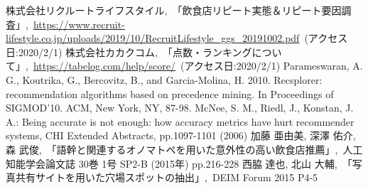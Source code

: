 \documentclass[honka]{nitkcthesis}%
\begin{document}










\backmatter



\begin{thebibliography}{99}
  株式会社リクルートライフスタイル,~「飲食店リピート実態＆リピート要因調査」,~\url{https://www.recruit-lifestyle.co.jp/uploads/2019/10/RecruitLifestyle\_ggs\_20191002.pdf}\ (アクセス日:2020/2/1)
  株式会社カカクコム,~「点数・ランキングについて」,~\url{https://tabelog.com/help/score/}\ (アクセス日:2020/2/1)
   Parameswaran, A. G., Koutrika, G., Bercovitz, B., and Garcia-Molina, H. 2010. Recsplorer: recommendation algorithms based on precedence mining. In Proceedings of SIGMOD’10. ACM, New York, NY, 87-98.
   McNee, S. M., Riedl, J., Konstan, J. A.: Being accurate is not enough: how accuracy metrics have hurt recommender systems, CHI Extended Abstracts, pp.1097-1101 (2006)
   加藤 亜由美, 深澤 佑介, 森 武俊,~「語幹と関連するオノマトペを用いた意外性の高い飲食店推薦」,~人工知能学会論文誌 30巻 1号 SP2-B (2015年) pp.216-228
   西脇 達也, 北山 大輔,~「写真共有サイトを用いた穴場スポットの抽出」,~DEIM Forum 2015 P4-5
\end{thebibliography}


\appendix

\end{document}
